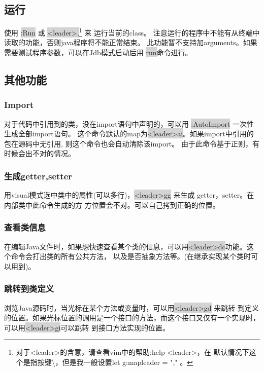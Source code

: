 \documentclass[oneside,openany]{book}
\begin{document}
\subsection{运行}
    使用 \colorbox{lightgray}{:Run} 或 \colorbox{lightgray}{<leader>,}\footnote{对于<leader>的含意，请查看vim中的帮助:help <leader>，在
默认情况下这个是指按键\textbackslash，但是我一般设置let g:mapleader = "," 。} 来 运行当前的class。
注意运行的程序中不能有从终端中读取的功能，否则java程序将不能正常结束。
此功能暂不支持加arguments。如果需要测试程序参数，可以在Jdb模式启动后用 \colorbox{lightgray}{run}命令进行。

\subsection{其他功能}

\subsubsection{Import}
    对于代码中引用到的类，没在import语句中声明的，可以用 \colorbox{lightgray}{:AutoImport} 一次性生成全部import语句。 
这个命令默认的map为\colorbox{lightgray}{<leader>ai}。如果import中引用的包在源码中无引用, 则这个命令也会自动清除该import。
由于此命令基于正则，有时候会出不对的情况。

\subsubsection{生成getter,setter}
    用visual模式选中类中的属性(可以多行)，\colorbox{lightgray}{<leader>gg} 来生成 getter，setter。在内部类中此命令生成的方
方位置会不对。可以自己拷到正确的位置。

\subsubsection{查看类信息}
   在编辑Java文件时，如果想快速查看某个类的信息，可以用\colorbox{lightgray}{<leader>dc}功能。这个命令会打出类的所有公共方法，
以及是否抽象方法等。(在继承实现某个类时可以用到)。

\subsubsection{跳转到类定义}
浏览Java源码时，当光标在某个方法或变量时，可以用\colorbox{lightgray}{<leader>gd} 来跳转
到定义的位置。如果光标位置的调用是一个接口的方法，而这个接口又仅有一个实现时，可以用\colorbox{lightgray}{<leader>gi}可以跳转
到接口方法实现的位置。
\end{document}
